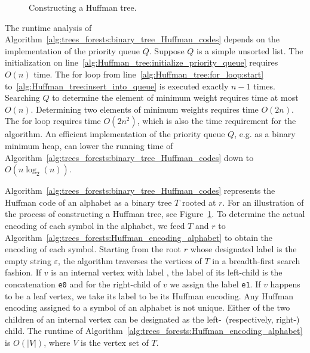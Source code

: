 \begin{figure}[!htbp]
\centering
{}

\caption{Constructing a Huffman tree.}
\label{fig:trees_forests:construct_Huffman_tree}
\end{figure}

The runtime analysis of
Algorithm~\ref{alg:trees_forests:binary_tree_Huffman_codes} depends on
the implementation of the priority queue
$Q$. Suppose $Q$ is a simple unsorted list. The
initialization on
line~\ref{alg:Huffman_tree:initialize_priority_queue} requires $O(n)$
time. The for loop from line~\ref{alg:Huffman_tree:for_loop:start}
to~\ref{alg:Huffman_tree:insert_into_queue} is executed exactly
$n - 1$ times. Searching $Q$ to determine the element of minimum
weight requires time at most $O(n)$. Determining two elements of
minimum weights requires time $O(2n)$. The for loop requires time
$O(2n^2)$, which is also the time requirement for the algorithm. An
efficient implementation of the priority queue $Q$, e.g. as a binary
minimum heap, can lower the running time of
Algorithm~\ref{alg:trees_forests:binary_tree_Huffman_codes} down to
$O(n \log_2(n))$.

Algorithm~\ref{alg:trees_forests:binary_tree_Huffman_codes} represents
the Huffman code of an alphabet as a
binary tree $T$ rooted at
$r$. For an illustration of the process of constructing a Huffman
tree, see Figure~\ref{fig:trees_forests:construct_Huffman_tree}. To
determine the actual encoding of each symbol in the alphabet, we feed
$T$ and $r$ to
Algorithm~\ref{alg:trees_forests:Huffman_encoding_alphabet} to obtain
the encoding of each symbol. Starting from the root $r$ whose
designated label is the empty string
$\varepsilon$\index{$\varepsilon$}, the algorithm traverses the
vertices of $T$ in a breadth-first search
fashion. If $v$ is an internal vertex with label \tte, the label of
its left-child is the concatenation \verb!e0! and
for the right-child of $v$ we assign the label
\verb!e1!. If $v$ happens to be a leaf vertex, we take its label to be
its Huffman encoding. Any Huffman encoding assigned to a symbol of an
alphabet is not unique. Either of the two children of an internal
vertex can be designated as the left-~(respectively, right-)
child. The runtime of
Algorithm~\ref{alg:trees_forests:Huffman_encoding_alphabet} is
$O(|V|)$, where $V$ is the vertex set of $T$.

